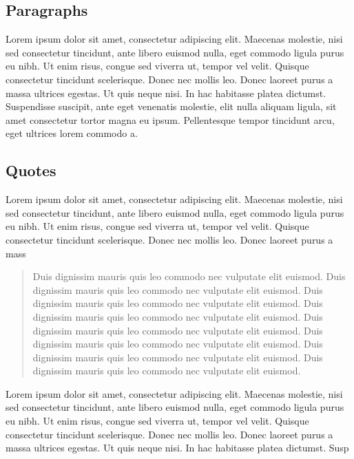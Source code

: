 \subsection{Paragraphs}

Lorem ipsum dolor sit amet, consectetur adipiscing elit. Maecenas molestie, nisi sed consectetur tincidunt, ante libero euismod nulla, eget commodo ligula purus eu nibh. Ut enim risus, congue sed viverra ut, tempor vel velit. Quisque consectetur tincidunt scelerisque. Donec nec mollis leo. Donec laoreet purus a massa ultrices egestas. Ut quis neque nisi. In hac habitasse platea dictumst. Suspendisse suscipit, ante eget venenatis molestie, elit nulla aliquam ligula, sit amet consectetur tortor magna eu ipsum. Pellentesque tempor tincidunt arcu, eget ultrices lorem commodo a.

\subsection{Quotes}

Lorem ipsum dolor sit amet, consectetur adipiscing elit. Maecenas molestie, nisi sed consectetur tincidunt, ante libero euismod nulla, eget commodo ligula purus eu nibh. Ut enim risus, congue sed viverra ut, tempor vel velit. Quisque consectetur tincidunt scelerisque. Donec nec mollis leo. Donec laoreet purus a mass

\begin{quote}
  Duis dignissim mauris quis leo commodo nec vulputate elit euismod. Duis dignissim mauris quis leo commodo nec vulputate elit euismod. Duis dignissim mauris quis leo commodo nec vulputate elit euismod. Duis dignissim mauris quis leo commodo nec vulputate elit euismod. Duis dignissim mauris quis leo commodo nec vulputate elit euismod. Duis dignissim mauris quis leo commodo nec vulputate elit euismod. Duis dignissim mauris quis leo commodo nec vulputate elit euismod. Duis dignissim mauris quis leo commodo nec vulputate elit euismod.
\end{quote}

Lorem ipsum dolor sit amet, consectetur adipiscing elit. Maecenas molestie, nisi sed consectetur tincidunt, ante libero euismod nulla, eget commodo ligula purus eu nibh. Ut enim risus, congue sed viverra ut, tempor vel velit. Quisque consectetur tincidunt scelerisque. Donec nec mollis leo. Donec laoreet purus a massa ultrices egestas. Ut quis neque nisi. In hac habitasse platea dictumst. Susp

